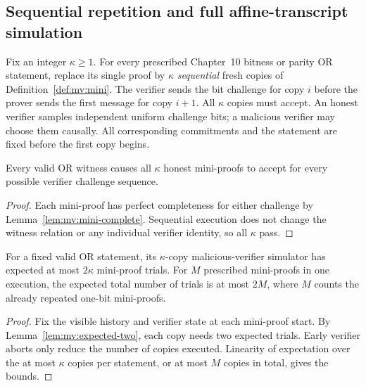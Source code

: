 \subsection{Sequential repetition and full affine-transcript simulation}\label{sec:mv:sequential}

\begin{definition}\label{def:mv:repeat}
Fix an integer $\kappa\ge1$.
For every prescribed Chapter~10 bitness or
parity OR statement, replace its single
proof by $\kappa$ \emph{sequential}
fresh copies of Definition~\ref{def:mv:mini}.
The verifier sends the bit challenge for
copy $i$ before the prover sends the first
message for copy $i+1$.
All $\kappa$ copies must accept.
An honest verifier samples independent
uniform challenge bits; a malicious
verifier may choose them causally.
All corresponding commitments and
the statement are fixed before the
first copy begins.
\end{definition}

\begin{lemma}\label{lem:mv:repeat-complete}
Every valid OR witness causes all
$\kappa$ honest mini-proofs to accept
for every possible verifier challenge sequence.
\end{lemma}
\begin{proof}
Each mini-proof has perfect completeness
for either challenge by
Lemma~\ref{lem:mv:mini-complete}.
Sequential execution does not change
the witness relation or any individual
verifier identity, so all $\kappa$ pass.
\end{proof}

\begin{lemma}\label{lem:mv:repeat-cost}
For a fixed valid OR statement, its
$\kappa$-copy malicious-verifier simulator
has expected at most $2\kappa$ mini-proof
trials. For $M$ prescribed mini-proofs
in one execution, the expected total
number of trials is at most $2M$,
where $M$ counts the already repeated
one-bit mini-proofs.
\end{lemma}
\begin{proof}
Fix the visible history and verifier
state at each mini-proof start.
By Lemma~\ref{lem:mv:expected-two},
each copy needs two expected trials.
Early verifier aborts only reduce
the number of copies executed.
Linearity of expectation over the
at most $\kappa$ copies per
statement, or at most $M$
copies in total, gives the bounds.
\end{proof}

